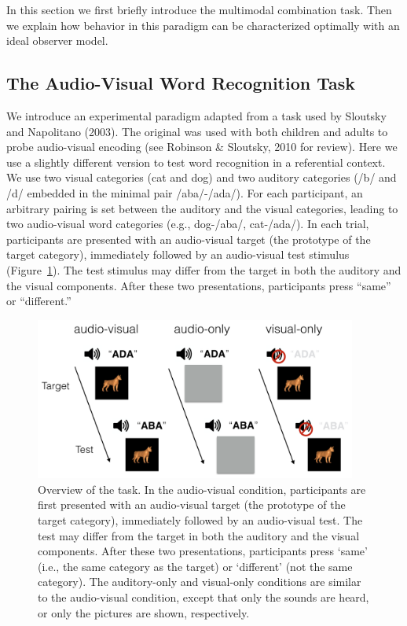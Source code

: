\documentclass[english,,man,floatsintext]{apa6}
\theoremstyle{definition}
\theoremstyle{definition}
\theoremstyle{definition}
\theoremstyle{remark}
\begin{document}
In this section we first briefly introduce the multimodal combination
task. Then we explain how behavior in this paradigm can be characterized
optimally with an ideal observer model.

\subsection{The Audio-Visual Word Recognition
Task}\label{the-audio-visual-word-recognition-task}

We introduce an experimental paradigm adapted from a task used by
Sloutsky and Napolitano (2003). The original was used with both children
and adults to probe audio-visual encoding (see Robinson \& Sloutsky,
2010 for review). Here we use a slightly different version to test word
recognition in a referential context. We use two visual categories (cat
and dog) and two auditory categories (/b/ and /d/ embedded in the
minimal pair /aba/-/ada/). For each participant, an arbitrary pairing is
set between the auditory and the visual categories, leading to two
audio-visual word categories (e.g., dog-/aba/, cat-/ada/). In each
trial, participants are presented with an audio-visual target (the
prototype of the target category), immediately followed by an
audio-visual test stimulus (Figure~\ref{fig:task}). The test stimulus
may differ from the target in both the auditory and the visual
components. After these two presentations, participants press
\enquote{same} or \enquote{different.}

\begin{figure}

{\centering \includegraphics[width=400px]{pictures/task} 

}

\caption{Overview of the task. In the audio-visual condition, participants are first presented with an audio-visual target (the prototype of the target category), immediately followed by an audio-visual test. The test may differ from the target in both the auditory and the visual components. After these two presentations, participants press `same' (i.e., the same category as the target) or `different' (not the same category). The auditory-only and visual-only conditions are similar to the audio-visual condition, except that only the sounds are heard, or only the pictures are shown, respectively.}\label{fig:task}
\end{figure}
\end{document}
